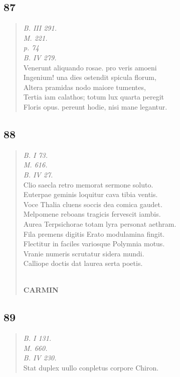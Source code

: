 \documentclass[11pt, a4paper]{report}
\begin{document}
            \subsection*{87}
      \begin{verse}
      \textit{B. III 291.} \\ \textit{M. 221.} \\ \textit{p. 74} \\ \textit{B. IV 279.} \\ Venerunt aliquando rosae. pro veris amoeni \\ Ingenium! una dies ostendit spicula florum, \\ Altera pramidas nodo maiore tumentes, \\ Tertia iam calathos; totum lux quarta peregit \\ Floris opus. pereunt hodie, nisi mane legantur. \\ 
      \end{verse}
  
            \subsection*{88}
      \begin{verse}
      \textit{B. I 73.} \\ \textit{M. 616.} \\ \textit{B. IV 27.} \\ Clio saecla retro memorat sermone soluto. \\ Euterpae geminis loquitur cava tibia ventis. \\ Voce Thalia cluens soccis dea comica gaudet. \\ Melpomene reboans tragicis fervescit iambis. \\ Aurea Terpsichorae totam lyra personat aethram. \\ Fila premens digitis Erato modulamina fingit. \\ Flectitur in faciles variosque Polymnia motus. \\ Vranie numeris scrutatur sidera mundi. \\ Calliope doctis dat laurea serta poetis. \\ 
        ﻿\pagebreak 
    \begin{center} \textbf{CARMIN} \end{center} \marginpar{[100]} 
      \end{verse}
  
            \subsection*{89}
      \begin{verse}
      \textit{B. I 131.} \\ \textit{M. 660.} \\ \textit{B. IV 230.} \\ Stat duplex uullo conpletus corpore Chiron. \\ 
      \end{verse}
  
\end{document}
